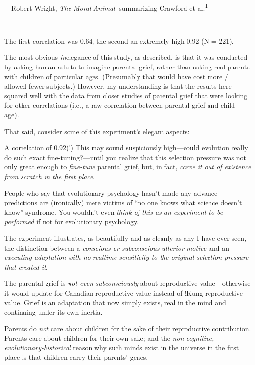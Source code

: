 {\raggedleft
 {}---Robert Wright, \textit{The Moral Animal},\newline
 summarizing Crawford et al.\textsuperscript{1}
\par}


\bigskip

{
 ~}

{
 The first correlation was 0.64, the second an extremely high 0.92
(N = 221).}

{
 The most obvious \textit{in}elegance of this study, as described,
is that it was conducted by asking human adults to imagine parental
grief, rather than asking real parents with children of particular
ages. (Presumably that would have cost more / allowed fewer subjects.)
However, my understanding is that the results here squared well with
the data from closer studies of parental grief that were looking for
other correlations (i.e., a raw correlation between parental grief and
child age).}

{
 That said, consider some of this experiment's
elegant aspects:}

{
 A correlation of 0.92(!) This may sound suspiciously high---could
evolution really do such exact fine-tuning?---until you realize that
this selection pressure was not only great enough to \textit{fine-tune}
parental grief, but, in fact, \textit{carve it out of existence from
scratch in the first place.}}

{
 People who say that evolutionary psychology hasn't
made any advance predictions are (ironically) mere victims of
``no one knows what science doesn't
know'' syndrome. You wouldn't even
\textit{think of this as an experiment to be performed} if not for
evolutionary psychology.}

{
 The experiment illustrates, as beautifully and as cleanly as any I
have ever seen, the distinction between a \textit{conscious or
subconscious ulterior motive} and an \textit{executing adaptation with
no realtime sensitivity to the original selection pressure that created
it.}}

{
 The parental grief is \textit{not even subconsciously} about
reproductive value---otherwise it would update for Canadian
reproductive value instead of !Kung reproductive value. Grief is an
adaptation that now simply exists, real in the mind and continuing
under its own inertia.}

{
 Parents do \textit{not} care about children for the sake of their
reproductive contribution. Parents care about children for their own
sake; and the \textit{non-cognitive, evolutionary-historical} reason
why such minds exist in the universe in the first place is that
children carry their parents' genes.}

